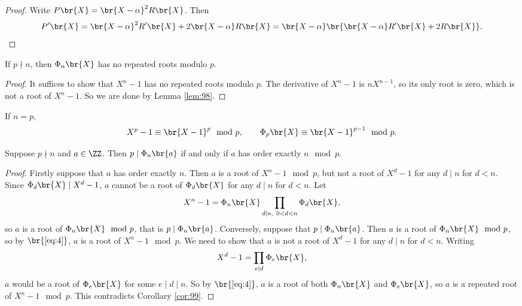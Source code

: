 \begin{proof}
Write $ P\br{X} = \br{X - \alpha}^2R\br{X} $. Then
$$ P'\br{X} = \br{X - \alpha}^2R'\br{X} + 2\br{X - \alpha}R\br{X} = \br{X - \alpha}\br{\br{X - \alpha}R'\br{X} + 2R\br{X}}. $$
\end{proof}

\begin{corollary}
\label{cor:99}
If $ p \nmid n $, then $ \Phi_n\br{X} $ has no repeated roots modulo $ p $.
\end{corollary}

\begin{proof}
It suffices to show that $ X^n - 1 $ has no repeated roots modulo $ p $. The derivative of $ X^n - 1 $ is $ nX^{n - 1} $, so its only root is zero, which is not a root of $ X^n - 1 $. So we are done by Lemma \ref{lem:98}.
\end{proof}

\begin{note*}
If $ n = p $,
$$ X^p - 1 \equiv \br{X - 1}^p \mod p, \qquad \Phi_p\br{X} \equiv \br{X - 1}^{p - 1} \mod p. $$
\end{note*}

\begin{theorem}
\label{thm:100}
Suppose $ p \nmid n $ and $ a \in \ZZ $. Then $ p \mid \Phi_n\br{a} $ if and only if $ a $ has order exactly $ n \mod p $.
\end{theorem}

\begin{proof}
Firstly suppose that $ a $ has order exactly $ n $. Then $ a $ is a root of $ X^n - 1 \mod p $, but not a root of $ X^d - 1 $ for any $ d \mid n $ for $ d < n $. Since $ \Phi_d\br{X} \mid X^d - 1 $, $ a $ cannot be a root of $ \Phi_d\br{X} $ for any $ d \mid n $ for $ d < n $. Let
\begin{equation}
\label{eq:4}
X^n - 1 = \Phi_n\br{X}\prod_{d \mid n, \ 0 < d < n} \Phi_d\br{X},
\end{equation}
so $ a $ is a root of $ \Phi_n\br{X} \mod p $, that is $ p \mid \Phi_n\br{a} $. Conversely, suppose that $ p \mid \Phi_n\br{a} $. Then $ a $ is a root of $ \Phi_n\br{X} \mod p $, so by $ \br{\ref{eq:4}} $, $ a $ is a root of $ X^n - 1 \mod p $. We need to show that $ a $ is not a root of $ X^d - 1 $ for any $ d \mid n $ for $ d < n $. Writing
$$ X^d - 1 = \prod_{e \mid d} \Phi_e\br{X}, $$
$ a $ would be a root of $ \Phi_e\br{X} $ for some $ e \mid d \mid n $. So by $ \br{\ref{eq:4}} $, $ a $ is a root of both $ \Phi_n\br{X} $ and $ \Phi_e\br{X} $, so $ a $ is a repeated root of $ X^n - 1 \mod p $. This contradicts Corollary \ref{cor:99}.
\end{proof}

